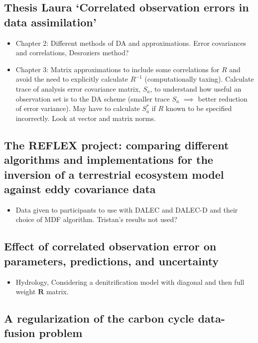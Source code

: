 \documentclass[11pt]{article}
\begin{document}
\subsection*{Thesis Laura `Correlated observation errors in data assimilation' \cite{stewart2008correlated}}

\begin{itemize}
\item Chapter 2: Different methods of DA and approximations. Error covariances and correlations, Desroziers method?
\item Chapter 3: Matrix approximations to include some correlations for $R$ and avoid the need to explicitly calculate $R^{-1}$ (computationally taxing). Calculate trace of analysis error covariance matrix, $S_{a}$, to understand how useful an observation set is to the DA scheme (smaller trace $S_{a}$ $\implies$ better reduction of error variance). May have to calculate $S_{a}^{*}$ if $R$ known to be specified incorrectly. Look at vector and matrix norms.
\end{itemize}

\subsection*{The REFLEX project: comparing different algorithms and implementations for the inversion of a terrestrial ecosystem model against eddy covariance data \cite{fox2009reflex}}

\begin{itemize}
\item Data given to participants to use with DALEC and DALEC-D and their choice of MDF algorithm. Tristan's results not used?
\end{itemize}

\subsection*{Effect of correlated observation error on parameters, predictions, and uncertainty \cite{tiedeman2013effect}}

\begin{itemize}
\item Hydrology, Considering a denitrification model with diagonal and then full weight $\textbf{R}$ matrix.
\end{itemize}

\subsection*{A regularization of the carbon cycle data-fusion problem \cite{delahaies2013regularization}}
\end{document}
